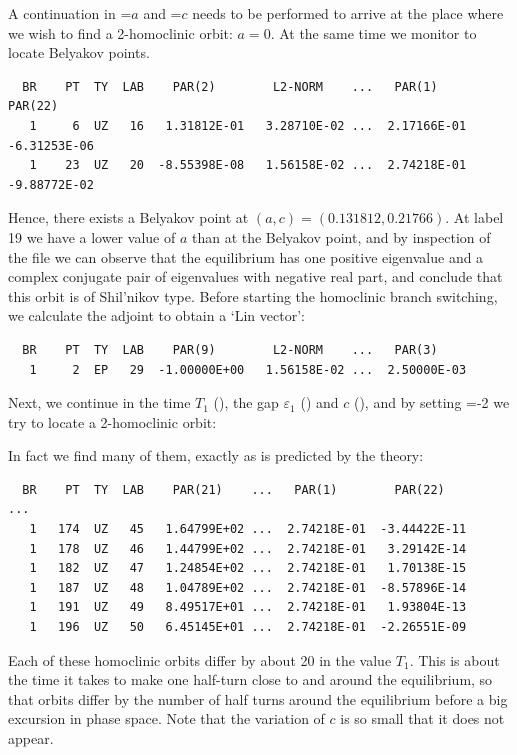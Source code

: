 \documentclass[12pt]{report}
\begin{document}
A continuation in =$a$ and =$c$ needs to be 
performed to arrive
at the place where we wish to find a 2-homoclinic orbit: $a=0$. At the
same time we monitor  to locate Belyakov points.
\begin{center}
\end{center}
\begin{verbatim}
  BR    PT  TY  LAB    PAR(2)        L2-NORM    ...   PAR(1)        PAR(22)
   1     6  UZ   16   1.31812E-01   3.28710E-02 ...  2.17166E-01  -6.31253E-06
   1    23  UZ   20  -8.55398E-08   1.56158E-02 ...  2.74218E-01  -9.88772E-02
\end{verbatim}
Hence, there exists a Belyakov point at $(a,c)=(0.131812,0.21766)$.
At label 19 we have a lower value of $a$ than at the Belyakov point,
and by inspection of the file
 we can observe that the equilibrium has one positive
eigenvalue and a complex conjugate pair of eigenvalues with negative
real part, and conclude that this orbit is of Shil'nikov type.
Before starting the homoclinic branch switching, we calculate
the adjoint to obtain a `Lin vector':
\begin{center}
\end{center}
\begin{verbatim}
  BR    PT  TY  LAB    PAR(9)        L2-NORM    ...   PAR(3)     
   1     2  EP   29  -1.00000E+00   1.56158E-02 ...  2.50000E-03
\end{verbatim}
Next, we continue in the time $T_1$ (), the gap
$\varepsilon_1$ () and $c$ (), 
and by setting =-2
we try to locate a 2-homoclinic orbit:
\begin{center}
\end{center}
In fact we find many of them, exactly as is predicted by the theory:
\begin{verbatim}
  BR    PT  TY  LAB    PAR(21)    ...   PAR(1)        PAR(22)
... 
   1   174  UZ   45   1.64799E+02 ...  2.74218E-01  -3.44422E-11
   1   178  UZ   46   1.44799E+02 ...  2.74218E-01   3.29142E-14
   1   182  UZ   47   1.24854E+02 ...  2.74218E-01   1.70138E-15
   1   187  UZ   48   1.04789E+02 ...  2.74218E-01  -8.57896E-14
   1   191  UZ   49   8.49517E+01 ...  2.74218E-01   1.93804E-13
   1   196  UZ   50   6.45145E+01 ...  2.74218E-01  -2.26551E-09
\end{verbatim}
Each of these homoclinic orbits differ 
by about 20 in the value $T_1$. This is about 
the time it takes to make one half-turn close to and
around the equilibrium, so that orbits differ by the number of 
half turns around the equilibrium before a big excursion
in phase space. Note that the variation of 
$c$ is so small that it does not appear.
\end{document}
